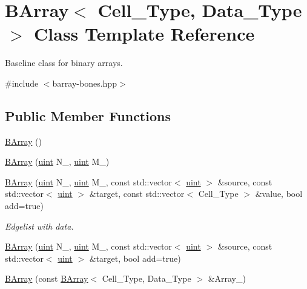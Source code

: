 \hypertarget{class_b_array}{}\section{B\+Array$<$ Cell\+\_\+\+Type, Data\+\_\+\+Type $>$ Class Template Reference}
\label{class_b_array}


Baseline class for binary arrays.  




{\ttfamily \#include $<$barray-\/bones.\+hpp$>$}

\subsection*{Public Member Functions}
\begin{DoxyCompactItemize}
\item 
\hyperlink{class_b_array_a1bbfcc43ad43f30fd448b63e9ab5861f}{B\+Array} ()
\item 
\hyperlink{class_b_array_a411b65e1985396261ca9df2923a6f3c6}{B\+Array} (\hyperlink{typedefs_8hpp_a91ad9478d81a7aaf2593e8d9c3d06a14}{uint} N\+\_\+, \hyperlink{typedefs_8hpp_a91ad9478d81a7aaf2593e8d9c3d06a14}{uint} M\+\_\+)
\item 
\hyperlink{class_b_array_a098b6170a1ea4b2a8e0832d1163e9ed1}{B\+Array} (\hyperlink{typedefs_8hpp_a91ad9478d81a7aaf2593e8d9c3d06a14}{uint} N\+\_\+, \hyperlink{typedefs_8hpp_a91ad9478d81a7aaf2593e8d9c3d06a14}{uint} M\+\_\+, const std\+::vector$<$ \hyperlink{typedefs_8hpp_a91ad9478d81a7aaf2593e8d9c3d06a14}{uint} $>$ \&source, const std\+::vector$<$ \hyperlink{typedefs_8hpp_a91ad9478d81a7aaf2593e8d9c3d06a14}{uint} $>$ \&target, const std\+::vector$<$ Cell\+\_\+\+Type $>$ \&value, bool add=true)
\begin{DoxyCompactList}\small\item\em Edgelist with data. \end{DoxyCompactList}\item 
\hyperlink{class_b_array_aa5f13f86c045a1f9c39b9a7df4126c78}{B\+Array} (\hyperlink{typedefs_8hpp_a91ad9478d81a7aaf2593e8d9c3d06a14}{uint} N\+\_\+, \hyperlink{typedefs_8hpp_a91ad9478d81a7aaf2593e8d9c3d06a14}{uint} M\+\_\+, const std\+::vector$<$ \hyperlink{typedefs_8hpp_a91ad9478d81a7aaf2593e8d9c3d06a14}{uint} $>$ \&source, const std\+::vector$<$ \hyperlink{typedefs_8hpp_a91ad9478d81a7aaf2593e8d9c3d06a14}{uint} $>$ \&target, bool add=true)
\item 
\hyperlink{class_b_array_ac003699092c4f91c5b292320ca769f85}{B\+Array} (const \hyperlink{class_b_array}{B\+Array}$<$ Cell\+\_\+\+Type, Data\+\_\+\+Type $>$ \&Array\+\_\+)

\end{DoxyCompactItemize}
